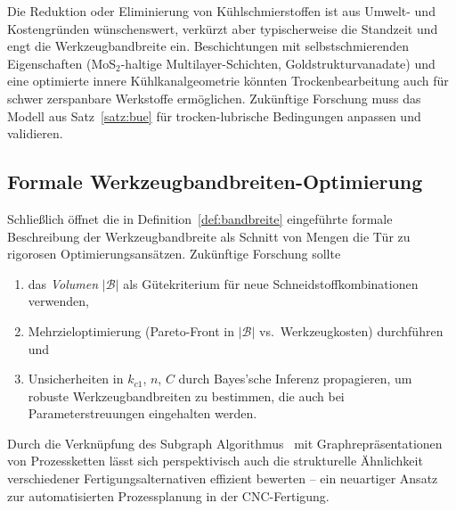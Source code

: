 ﻿\documentclass[a4paper,12pt]{article}
\theoremstyle{definition}
\begin{document}
Die Reduktion oder Eliminierung von Kühlschmierstoffen ist aus
Umwelt- und Kostengründen wünschenswert, verkürzt aber typischerweise die
Standzeit und engt die Werkzeugbandbreite ein. Beschichtungen mit
selbstschmierenden Eigenschaften (MoS$_2$-haltige Multilayer-Schichten,
Goldstrukturvanadate) und eine optimierte innere Kühlkanalgeometrie könnten
Trockenbearbeitung auch für schwer zerspanbare Werkstoffe ermöglichen.
Zukünftige Forschung muss das Modell aus Satz~\ref{satz:bue} für
trocken-lubrische Bedingungen anpassen und validieren.

\subsection{Formale Werkzeugbandbreiten-Optimierung}

Schließlich öffnet die in Definition~\ref{def:bandbreite} eingeführte
formale Beschreibung der Werkzeugbandbreite als Schnitt von Mengen die Tür
zu rigorosen Optimierungsansätzen. Zukünftige Forschung sollte

\begin{enumerate}
  \item das \emph{Volumen} $|\mathcal{B}|$ als Gütekriterium für neue
        Schneidstoffkombinationen verwenden,
  \item Mehrzieloptimierung (Pareto-Front in $|\mathcal{B}|$ vs.\ Werkzeugkosten)
        durchführen und
  \item Unsicherheiten in $k_{c1}$, $n$, $C$ durch Bayes'sche Inferenz
        propagieren, um robuste Werkzeugbandbreiten zu bestimmen, die auch
        bei Parameterstreuungen eingehalten werden.
\end{enumerate}

Durch die Verknüpfung des Subgraph Algorithmus~\cite{epp2026subgraph} mit
Graphrepräsentationen von Prozessketten lässt sich perspektivisch auch die
strukturelle Ähnlichkeit verschiedener Fertigungsalternativen effizient
bewerten -- ein neuartiger Ansatz zur automatisierten Prozessplanung in der
CNC-Fertigung.
\end{document}
